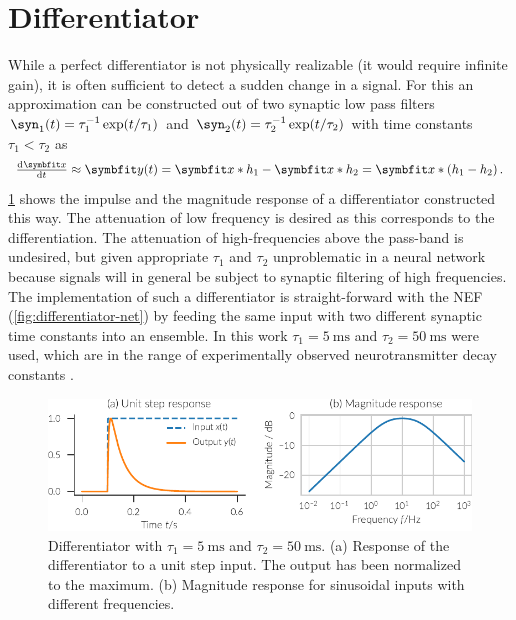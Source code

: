 \section{Differentiator}\label{sec:differentiator}
While a perfect differentiator is not physically realizable (it would require infinite gain), it is often sufficient to detect a sudden change in a signal.
For this an approximation can be constructed out of two synaptic low pass filters $\syn_1(t) =  \tau_1^{-1} \exp(t/\tau_1)$ and $\syn_2(t) = \tau_2^{-1} \exp(t/\tau_2)$ with time constants $\tau_1 < \tau_2$ as
\begin{equation}
    \od{\vc x}{t} \approx \vc y(t) = \vc x * h_1 - \vc x * h_2 = \vc x * \del{h_1 - h_2} \text{.}
\end{equation}
\cref{fig:differentiator} shows the impulse and the magnitude response of a differentiator constructed this way.
The attenuation of low frequency is desired as this corresponds to the differentiation.
The attenuation of high-frequencies above the pass-band is undesired, but given appropriate $\tau_1$ and $\tau_2$ unproblematic in a neural network because signals will in general be subject to synaptic filtering of high frequencies.
The implementation of such a differentiator is straight-forward with the NEF (\cref{fig:differentiator-net}) by feeding the same input with two different synaptic time constants into an ensemble.
In this work $\tau_1 = \SI{5}{\milli\second}$ and $\tau_2 = \SI{50}{\milli\second}$ were used, which are in the range of experimentally observed neurotransmitter decay constants \parencite{sah1990-1,moreno-bote2005}.
\begin{figure}
    \centering
    \includegraphics{figures/differentiator}
    \caption[Differentiator]{Differentiator with $\tau_1 = \SI{5}{\milli\second}$ and $\tau_2 = \SI{50}{\milli\second}$. (a) Response of the differentiator to a unit step input. The output has been normalized to the maximum. (b) Magnitude response for sinusoidal inputs with different frequencies.}\label{fig:differentiator}
\end{figure}
